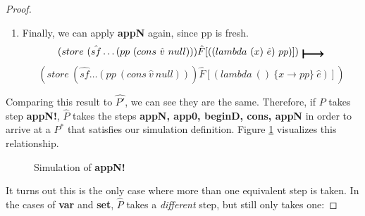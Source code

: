 \begin{proof}
\begin{enumerate}
    
    \item Finally, we can apply \textbf{appN} again, since pp is fresh.
    \[
    (store\ (\hat{sf} \dots (pp\ (cons\ \hat{v}\ null))) \hat{F}[((lambda\ (x)\  \hat{e})\ pp)])\ \step
    \]
    \[
    (store\ (\hat{sf} \dots (pp\ (cons\ \hat{v}\ null))) \hat{F}[(lambda\ ()\  \{x \xrightarrow{} pp\}\ \hat{e})])
    \]
\end{enumerate}

Comparing this result to $\hat{P'}$, we can see they are the same. Therefore, if $P$ takes step \textbf{appN!}, $\hat{P}$ takes the steps \textbf{appN, app0, beginD, cons, appN} in order to arrive at a $P^{*}$ that satisfies our simulation definition. Figure \ref{fig:appn!_steps} visualizes this relationship.

\begin{figure}[h]
    \centering
    \caption{Simulation of \textbf{appN!}}
    \label{fig:appn!_steps}
\end{figure}

It turns out this is the only case where more than one equivalent step is taken. In the cases of \textbf{var} and \textbf{set}, $\hat{P}$ takes a \textit{different} step, but still only takes one:


\end{proof}
